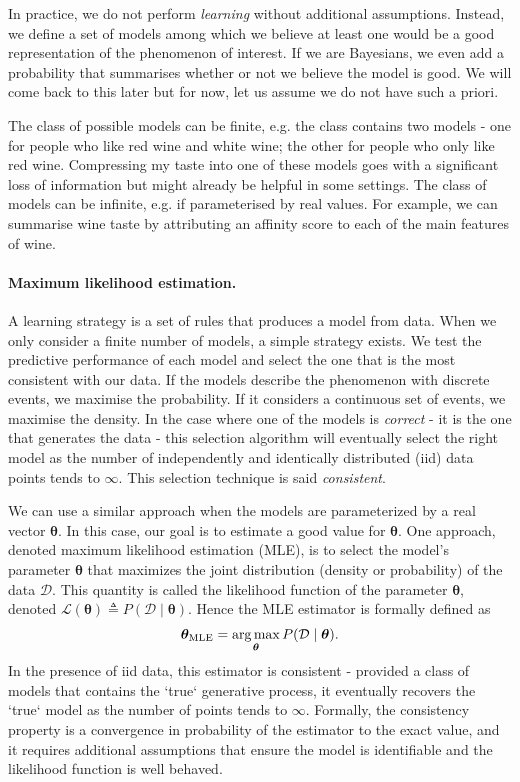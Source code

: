 In practice, we do not perform \textit{learning} without additional assumptions. Instead, we define a set of models among which we believe at least one would be a good representation of the phenomenon of interest. If we are Bayesians, we even add a probability that summarises whether or not we believe the model is good. We will come back to this later but for now, let us assume we do not have such a priori.

The class of possible models can be finite, e.g. the class contains two models - one for people who like red wine and white wine; the other for people who only like red wine. Compressing my taste into one of these models goes with a significant loss of information but might already be helpful in some settings. The class of models can be infinite, e.g. if parameterised by real values. For example, we can summarise wine taste by attributing an affinity score to each of the main features of wine.
\paragraph{Maximum likelihood estimation.}
A learning strategy is a set of rules that produces a model from data. When we only consider a finite number of models, a simple strategy exists. We test the predictive performance of each model and select the one that is the most consistent with our data. If the models describe the phenomenon with discrete events, we maximise the probability. If it considers a continuous set of events, we maximise the density. In the case where one of the models is \textit{correct} - it is the one that generates the data - this selection algorithm will eventually select the right model as the number of independently and identically distributed (iid) data points tends to $\infty$. This selection technique is said \textit{consistent}.

We can use a similar approach when the models are parameterized by a real vector $\bm{\theta}$. In this case, our goal is to estimate a good value for $\bm{\theta}$. One approach, denoted maximum likelihood estimation (MLE), is to select the model's parameter $\bm{\theta}$ that maximizes the  joint distribution (density or probability) of the data $\mathcal{D}$. This quantity is called the likelihood function of the parameter $\bm{\theta}$, denoted $\mathcal{L}(\bm{\theta}) \triangleq P(\mathcal{D}\mid\bm{\theta})$. Hence the MLE estimator is formally defined as
\begin{align}
   \bm{\theta}_{\text{MLE}} = \operatorname*{arg\,max}_{\bm{\theta}} P(\mathcal{D}\mid\bm{\theta}). \label{eq:chap02:MLE}
\end{align}
In the presence of iid data, this estimator is consistent - provided a class of models that contains the `true` generative process, it eventually recovers the `true` model as the number of points tends to $\infty$. Formally, the consistency property is a convergence in probability of the estimator to the exact value, and it requires additional assumptions that ensure the model is identifiable and the likelihood function is well behaved. %

